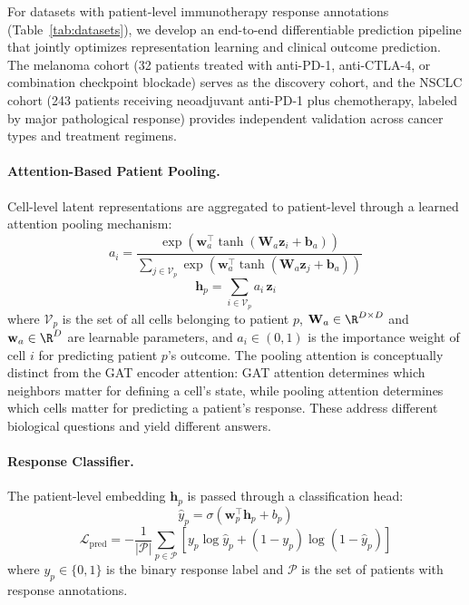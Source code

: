 \documentclass{article}
\newcommand{\sigmoid}{\sigma}
\begin{document}
For datasets with patient-level immunotherapy response annotations (Table~\ref{tab:datasets}), we develop an end-to-end differentiable prediction pipeline that jointly optimizes representation learning and clinical outcome prediction. The melanoma cohort (32 patients treated with anti-PD-1, anti-CTLA-4, or combination checkpoint blockade) serves as the discovery cohort, and the NSCLC cohort (243 patients receiving neoadjuvant anti-PD-1 plus chemotherapy, labeled by major pathological response) provides independent validation across cancer types and treatment regimens.

\paragraph{Attention-Based Patient Pooling.} Cell-level latent representations are aggregated to patient-level through a learned attention pooling mechanism:
\begin{equation}
    a_i = \frac{\exp\!\left(\mathbf{w}_a^\top \tanh(\mathbf{W}_a \mathbf{z}_i + \mathbf{b}_a)\right)}{\sum_{j \in \mathcal{V}_p} \exp\!\left(\mathbf{w}_a^\top \tanh(\mathbf{W}_a \mathbf{z}_j + \mathbf{b}_a)\right)}
    \label{eq:pool_attention}
\end{equation}
\begin{equation}
    \mathbf{h}_p = \sum_{i \in \mathcal{V}_p} a_i \, \mathbf{z}_i
    \label{eq:patient_embed}
\end{equation}
where $\mathcal{V}_p$ is the set of all cells belonging to patient $p$, $\mathbf{W}_a \in \R^{D \times D}$ and $\mathbf{w}_a \in \R^{D}$ are learnable parameters, and $a_i \in (0, 1)$ is the importance weight of cell $i$ for predicting patient $p$'s outcome. The pooling attention is conceptually distinct from the GAT encoder attention: GAT attention determines which neighbors matter for defining a cell's state, while pooling attention determines which cells matter for predicting a patient's response. These address different biological questions and yield different answers.

\paragraph{Response Classifier.} The patient-level embedding $\mathbf{h}_p$ is passed through a classification head:
\begin{equation}
    \hat{y}_p = \sigmoid(\mathbf{w}_p^\top \mathbf{h}_p + b_p)
    \label{eq:classifier}
\end{equation}
\begin{equation}
    \mathcal{L}_{\text{pred}} = -\frac{1}{|\mathcal{P}|} \sum_{p \in \mathcal{P}} \left[ y_p \log \hat{y}_p + (1 - y_p) \log(1 - \hat{y}_p) \right]
    \label{eq:pred_loss}
\end{equation}
where $y_p \in \{0, 1\}$ is the binary response label and $\mathcal{P}$ is the set of patients with response annotations.
\end{document}
